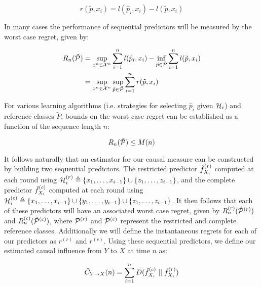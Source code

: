 \begin{equation}
r(\tilde{p},x_i) = l(\hat{p}_i,x_i) - l(\tilde{p},x_i)
\end{equation}

\noindent In many cases the performance of sequential predictors will be measured by the worst case regret, given by:

\begin{equation}
\begin{aligned}
R_n(\tilde{\mathcal{P}}) &= \sup_{x^n \in \mathcal{X}^n} \sum_{i=1}^n l(\hat{p}_i,x_i) - \inf_{\tilde{p}\in \tilde{\mathcal{P}}} \sum_{i=1}^n l(\tilde{p},x_i) \\
&= \sup_{x^n \in \mathcal{X}^n} \sup_{\tilde{p}\in \tilde{\mathcal{P}}} \sum_{i=1}^n r(\tilde{p},x_i)
\end{aligned}
\end{equation}

\noindent For various learning algorithms (i.e. strategies for selecting $\hat{p}_i$ given $\mathcal{H}_i$) and reference classes $\tilde{P}$, bounds on the worst case regret can be established as a function of the sequence length $n$:

\begin{equation}
R_n(\tilde{\mathcal{P}}) \le M(n)
\end{equation}

It follows naturally that an estimator for our causal measure can be constructed by building two sequential predictors. The restricted predictor $\hat{f}_{X_i}^{(r)}$ computed at each round using $\mathcal{H}_i^{(r)} \triangleq \{x_1,\dots,x_{i-1}\} \cup \{z_1,\dots,z_{i-1}\}$, and the complete predictor $\hat{f}_{X_i}^{(c)}$ computed at each round using $\mathcal{H}_i^{(c)} \triangleq \{x_1,\dots,x_{i-1}\} \cup \{y_1,\dots,y_{i-1}\} \cup \{z_1,\dots,z_{i-1}\}$. It then follows that each of these predictors will have an associated worst case regret, given by $R^{(r)}_n(\tilde{\mathcal{P}}^{(r)})$ and $R^{(c)}_n(\tilde{\mathcal{P}}^{(c)})$, where $\tilde{\mathcal{P}}^{(r)}$ and $\tilde{\mathcal{P}}^{(c)}$ represent the restricted and complete reference classes. Additionally we will define the instantaneous regrets for each of our predictors as $r^{(r)}$ and $r^{(c)}$. Using these sequential predictors, we define our estimated causal influence from $Y$ to $X$ at time $n$ as:

\begin{equation}
\hat{C}_{Y\rightarrow X}(n) = \sum_{i=1}^n D(\hat{f}_{X_i}^{(c)} \mid \mid \hat{f}_{X_i}^{(r)})
\end{equation}